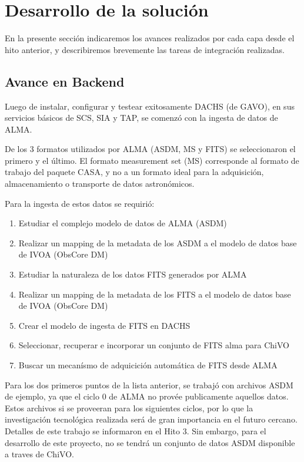 \section{Desarrollo de la solución}

En la presente sección indicaremos los avances realizados por cada
capa desde el hito anterior, y describiremos brevemente las tareas
de integración realizadas.

\subsection{Avance en Backend}

Luego de instalar, configurar y testear exitosamente DACHS (de GAVO),
en sus servicios básicos de SCS, SIA y TAP, se comenzó con la ingesta
de datos de ALMA.

De los 3 formatos utilizados por ALMA (ASDM, MS y FITS) se seleccionaron
el primero y el último. El formato measurement set (MS) corresponde 
al formato de trabajo del paquete CASA, y no a un formato ideal para la 
adquisición, almacenamiento o transporte de datos astronómicos.

Para la ingesta de estos datos se requirió:
\begin{enumerate}
\item Estudiar el complejo modelo de datos de ALMA (ASDM)
\item Realizar un mapping de la metadata de los ASDM a el modelo de datos base
de IVOA (ObsCore DM)
\item Estudiar la naturaleza de los datos FITS generados por ALMA
\item Realizar un mapping de la metadata de los FITS a el modelo de datos base
de IVOA (ObsCore DM)
\item Crear el modelo de ingesta de FITS en DACHS
\item Seleccionar, recuperar e incorporar un conjunto de FITS alma para ChiVO
\item Buscar un mecanísmo de adquicición automática de FITS desde ALMA
\end{enumerate}

Para los dos primeros puntos de la lista anterior, se trabajó con archivos
ASDM de ejemplo, ya que el ciclo 0 de ALMA no provée publicamente aquellos
datos. 
Estos archivos si 
se proveeran para los siguientes ciclos, por lo que
la investigación tecnológica realizada será de gran importancia en el
futuro cercano.  
Detalles de este trabajo se informaron en el Hito 3. 
Sin embargo, para el desarrollo de este proyecto, no se
tendrá un conjunto de datos ASDM disponible a traves de ChiVO.

